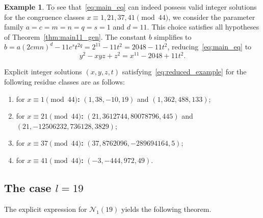\documentclass[11pt,a4paper]{amsart}
\theoremstyle{plain}
\theoremstyle{definition}
\newtheorem{example}[theorem]{Example}
\begin{document}
\begin{example}
To see that~\eqref{eq:main_eq} can indeed possess valid integer solutions for the congruence classes $x \equiv 1, 21, 37, 41 \pmod{44}$, we consider the parameter family $a=c=m=n=q=s=1$ and $d=11$. This choice satisfies all hypotheses of Theorem~\ref{thm:main11_gen}. The constant $b$ simplifies to $b = a  (2c m n)^d - 11c^s t^{2q} = 2^{11} - 11t^2 = 2048 - 11t^2$, reducing~\eqref{eq:main_eq} to
\begin{equation}\label{eq:reduced_example}
    y^2 - xyz + z^2 = x^{11} - 2048 + 11t^2.
\end{equation}

Explicit integer solutions $(x, y, z, t)$ satisfying~\eqref{eq:reduced_example} for the following residue classes are as follows:

\begin{enumerate}[label=(\alph*)]
\item for \textbf{$x \equiv 1 \pmod{44}$:} $(1, 38, -10, 19)$ and $(1, 362, 488, 133)$; 
    \item for \textbf{$x \equiv 21 \pmod{44}$:} $(21, 3612744, 80078796, 445)$ and $(21, -12506232, 736128, 3829)$;
    \item for \textbf{$x \equiv 37 \pmod{44}$:} $(37, 8762096, -289694164, 5)$;
    \item for \textbf{$x \equiv 41 \pmod{44}$:} $(-3, -444, 972, 49)$.
\end{enumerate}
\end{example}

\subsection{The case \texorpdfstring{$l = 19$}{l = 19}}
The explicit expression for $\mathcal{N}_1(19)$ yields the following theorem.
\end{document}
